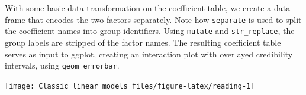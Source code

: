 \documentclass[]{svmono}
\newenvironment{Shaded}{\begin{snugshade}}{\end{snugshade}}
\newcommand{\KeywordTok}[1]{\textcolor[rgb]{0.13,0.29,0.53}{\textbf{#1}}}
\newcommand{\DataTypeTok}[1]{\textcolor[rgb]{0.13,0.29,0.53}{#1}}
\newcommand{\DecValTok}[1]{\textcolor[rgb]{0.00,0.00,0.81}{#1}}
\newcommand{\StringTok}[1]{\textcolor[rgb]{0.31,0.60,0.02}{#1}}
\newcommand{\OperatorTok}[1]{\textcolor[rgb]{0.81,0.36,0.00}{\textbf{#1}}}
\newcommand{\NormalTok}[1]{#1}
\begin{document}
With some basic data transformation on the coefficient table, we create
a data frame that encodes the two factors separately. Note how
\texttt{separate} is used to split the coefficient names into group
identifiers. Using \texttt{mutate} and \texttt{str\_replace}, the group
labels are stripped of the factor names. The resulting coefficient table
serves as input to ggplot, creating an interaction plot with overlayed
credibility intervals, using \texttt{geom\_errorbar}.

\begin{Shaded}
\end{Shaded}

\texttt{[image: Classic\_linear\_models\_files/figure-latex/reading-1]}
\end{document}
